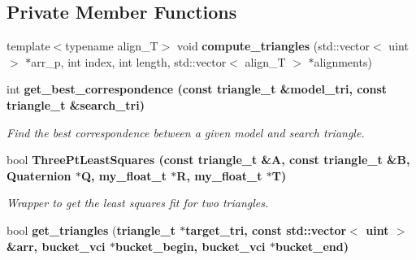 \subsection*{Private Member Functions}
\begin{CompactItemize}
\item 
template$<$typename align\_\-T$>$ void \textbf{compute\_\-triangles} (std::vector$<$ uint $>$ $\ast$arr\_\-p, int index, int length, std::vector$<$ align\_\-T $>$ $\ast$alignments)\label{classSimSite3D_1_1MatchTriangles_147928ad10a438af6c6e6ee6cefe10df}

\item 
int \bf{get\_\-best\_\-correspondence} (const \bf{triangle\_\-t} \&model\_\-tri, const \bf{triangle\_\-t} \&search\_\-tri)
\begin{CompactList}\small\item\em Find the best correspondence between a given model and search triangle. \item\end{CompactList}\item 
bool \bf{Three\-Pt\-Least\-Squares} (const \bf{triangle\_\-t} \&A, const \bf{triangle\_\-t} \&B, Quaternion $\ast$Q, my\_\-float\_\-t $\ast$R, my\_\-float\_\-t $\ast$T)
\begin{CompactList}\small\item\em Wrapper to get the least squares fit for two triangles. \item\end{CompactList}\item 
bool \textbf{get\_\-triangles} (\bf{triangle\_\-t} $\ast$target\_\-tri, const std::vector$<$ uint $>$ \&arr, bucket\_\-vci $\ast$bucket\_\-begin, bucket\_\-vci $\ast$bucket\_\-end)\label{classSimSite3D_1_1MatchTriangles_6212c1fe978ef723724ed5029963e109}

\end{CompactItemize}
